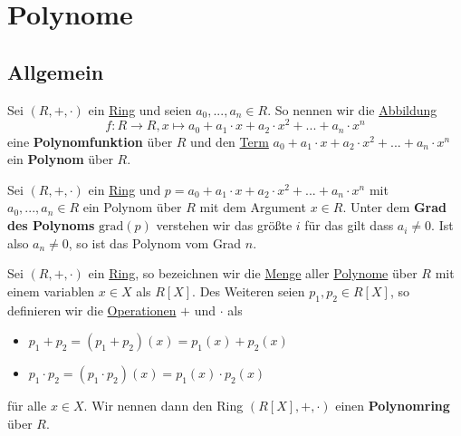 \documentclass[../../main.tex]{subfiles}
\begin{document}
	
	\chapter{Polynome}
	
		\section{Allgemein}

		\begin{definition}
			\label{def:Polynom}
			\label{def:Polynomfunktion}
			Sei $(R,+,\cdot)$ ein \hyperref[def:Ring]{Ring} und seien $a_0,...,a_n \in R$. So nennen wir die \hyperref[def:Abbildung]{Abbildung} $$f:R \rightarrow R, x \mapsto a_0 + a_1 \cdot x + a_2 \cdot x^2 + ... + a_n \cdot x^n$$
			eine \textbf{Polynomfunktion} über $R$ und den \hyperref[def:MathematischerTerm]{Term} $a_0 + a_1 \cdot x + a_2 \cdot x^2 + ... + a_n \cdot x^n$ ein \textbf{Polynom} über $R$. 
		\end{definition}
	
		\begin{definition}
			\label{def:GradEinesPolynoms}
			Sei $(R,+,\cdot)$ ein \hyperref[def:Ring]{Ring} und $p = a_0 + a_1 \cdot x + a_2 \cdot x^2 + ... + a_n \cdot x^n$ mit $a_0,...,a_n\in R$ ein Polynom über $R$ mit dem Argument $x \in R$. Unter dem \textbf{Grad des Polynoms} $\textrm{grad}(p)$ verstehen wir das größte $i$ für das gilt dass $a_i \not=0$. Ist also $a_n \not=0$, so ist das Polynom vom Grad $n$.
		\end{definition}
	
		\begin{definition}[Polynomring]
			\label{def:Polynomring}
			Sei $(R,+,\cdot)$ ein \hyperref[def:Ring]{Ring}, so bezeichnen wir die \hyperref[def:Menge]{Menge} aller \hyperref[def:Polynom]{Polynome} über $R$ mit einem variablen $x \in X$ als $R[X]$. Des Weiteren seien $p_1,p_2 \in R[X]$, so definieren wir die \hyperref[def:Operation]{Operationen} $+$ und $\cdot$ als
			\begin{itemize}
				\item $p_1 + p_2 = (p_1 + p_2)(x) = p_1(x) + p_2(x)$
				\item $p_1 \cdot p_2 = (p_1 \cdot p_2)(x) = p_1(x) \cdot p_2(x)$
			\end{itemize}
			für alle $x \in X$. Wir nennen dann den Ring $(R[X],+,\cdot)$ einen \textbf{Polynomring} über $R$.
			
		\end{definition}
	
\end{document}
